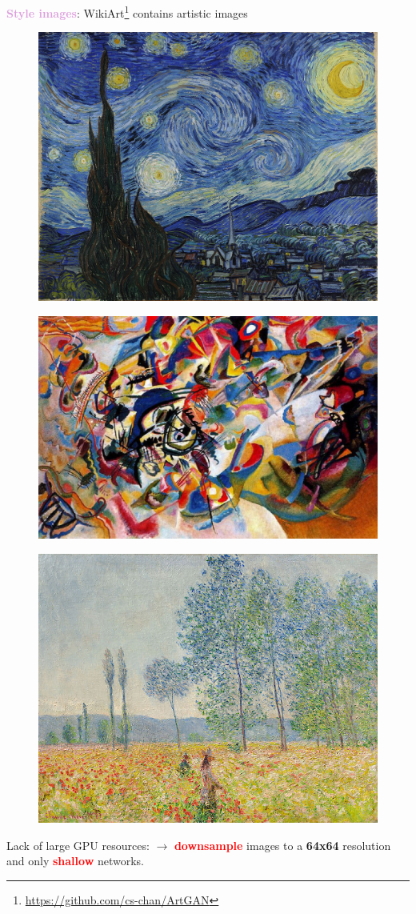 \documentclass[11pt,xcolor=dvipsnames]{beamer}
\begin{document}
\begin{frame}
\begin{multicols*}{3}
\end{multicols*}



\textcolor{Plum}{\textbf{Style images}}: WikiArt\footnote{\url{https://github.com/cs-chan/ArtGAN}} contains artistic images


\begin{multicols*}{3}

\begin{figure}
	\includegraphics[width=0.6\linewidth]{starry_night.jpg}
\end{figure}

\columnbreak

\begin{figure}
	\includegraphics[width=0.6 \linewidth]{kandinsky_composition.jpg}
\end{figure}

\columnbreak

\begin{figure}
	\includegraphics[width=0.6\linewidth]{monet.jpg}
\end{figure}

\end{multicols*}


Lack of large GPU resources: $\rightarrow$ \textcolor{red}{\textbf{downsample}} images to a \textbf{64x64} resolution and only \textcolor{red}{\textbf{shallow}} networks.

\end{frame}
\end{document}
